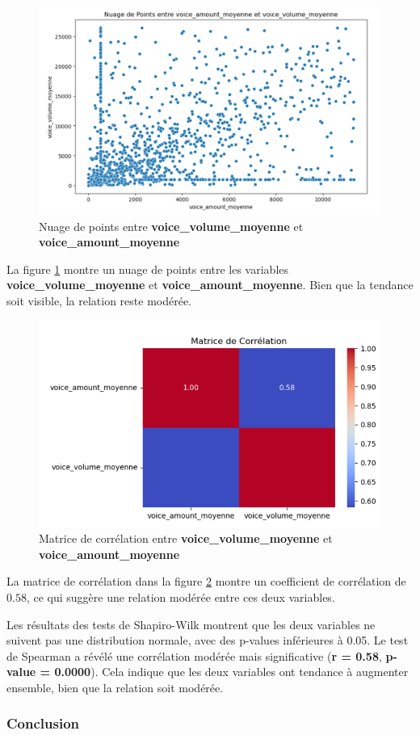 \begin{figure}[H]
    \centering
    \includegraphics[width=0.6\linewidth]{capture_sas_50.png}
    \caption{Nuage de points entre \textbf{voice\_volume\_moyenne} et \textbf{voice\_amount\_moyenne}}
    \label{nuage4}
\end{figure}

\noindent
La figure \ref{nuage4} montre un nuage de points entre les variables \textbf{voice\_volume\_moyenne} et \textbf{voice\_amount\_moyenne}. Bien que la tendance soit visible, la relation reste modérée.

\begin{figure}[H]
    \centering
    \includegraphics[width=0.5\linewidth]{capture_sas_51.png}
    \caption{Matrice de corrélation entre \textbf{voice\_volume\_moyenne} et \textbf{voice\_amount\_moyenne}}
    \label{matrice4}
\end{figure}

\noindent
La matrice de corrélation dans la figure \ref{matrice4} montre un coefficient de corrélation de \(0.58\), ce qui suggère une relation modérée entre ces deux variables.

\noindent
Les résultats des tests de Shapiro-Wilk montrent que les deux variables ne suivent pas une distribution normale, avec des p-values inférieures à 0.05. Le test de Spearman a révélé une corrélation modérée mais significative (\textbf{r = 0.58}, \textbf{p-value = 0.0000}). Cela indique que les deux variables ont tendance à augmenter ensemble, bien que la relation soit modérée.

\subsubsection*{Conclusion }

